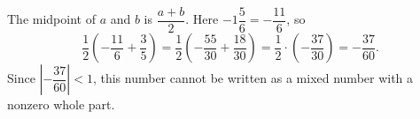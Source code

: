 The midpoint of $a$ and $b$ is $\dfrac{a+b}{2}$. Here $-1\dfrac{5}{6}=-\dfrac{11}{6}$, so
\[
\dfrac{1}{2}\left(-\dfrac{11}{6}+\dfrac{3}{5}\right)=\dfrac{1}{2}\left(-\dfrac{55}{30}+\dfrac{18}{30}\right)=\dfrac{1}{2}\cdot\left(-\dfrac{37}{30}\right)=\boxed{-\dfrac{37}{60}}.
\]
Since $\left|-\dfrac{37}{60}\right|<1$, this number cannot be written as a mixed number with a nonzero whole part.
